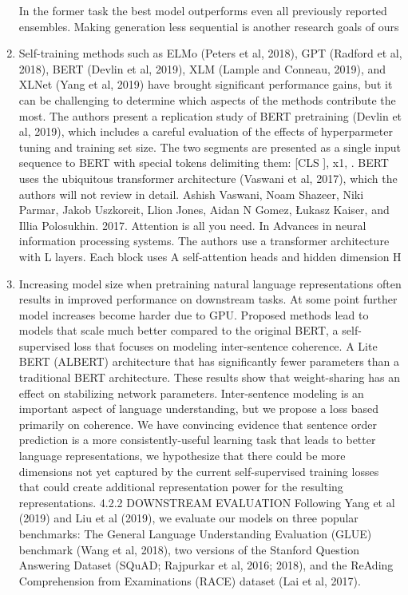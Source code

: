 \documentclass[11pt]{article}
\begin{document}
\begin{enumerate}
    In the former task the best model outperforms even all previously reported ensembles.
    Making generation less sequential is another research goals of ours\cite{atayl}
    \item Self-training methods such as ELMo (Peters et al, 2018), GPT (Radford et al, 2018), BERT (Devlin et al, 2019), XLM (Lample and Conneau, 2019), and XLNet (Yang et al, 2019) have brought significant performance gains, but it can be challenging to determine which aspects of the methods contribute the most.
    The authors present a replication study of BERT pretraining (Devlin et al, 2019), which includes a careful evaluation of the effects of hyperparmeter tuning and training set size.
    The two segments are presented as a single input sequence to BERT with special tokens delimiting them: [CLS ], x1, .
    BERT uses the ubiquitous transformer architecture (Vaswani et al, 2017), which the authors will not review in detail.
    Ashish Vaswani, Noam Shazeer, Niki Parmar, Jakob Uszkoreit, Llion Jones, Aidan N Gomez, Łukasz Kaiser, and Illia Polosukhin. 2017. Attention is all you need. In Advances in neural information processing systems.
    The authors use a transformer architecture with L layers.
    Each block uses A self-attention heads and hidden dimension H\cite{roberta}
    \item Increasing model size when pretraining natural language representations often results in improved performance on downstream tasks. At some point further model increases become harder due to GPU. Proposed methods lead to models that scale much better compared to the original BERT, a self-supervised loss that focuses on modeling inter-sentence coherence. A Lite BERT (ALBERT) architecture that has significantly fewer parameters than a traditional BERT architecture. These results show that weight-sharing has an effect on stabilizing network parameters. Inter-sentence modeling is an important aspect of language understanding, but we propose a loss based primarily on coherence. We have convincing evidence that sentence order prediction is a more consistently-useful learning task that leads to better language representations, we hypothesize that there could be more dimensions not yet captured by the current self-supervised training losses that could create additional representation power for the resulting representations. 4.2.2 DOWNSTREAM EVALUATION Following Yang et al (2019) and Liu et al (2019), we evaluate our models on three popular benchmarks: The General Language Understanding Evaluation (GLUE) benchmark (Wang et al, 2018), two versions of the Stanford Question Answering Dataset (SQuAD; Rajpurkar et al, 2016; 2018), and the ReAding Comprehension from Examinations (RACE) dataset (Lai et al, 2017). \cite{albert}

\end{enumerate}
\end{document}
